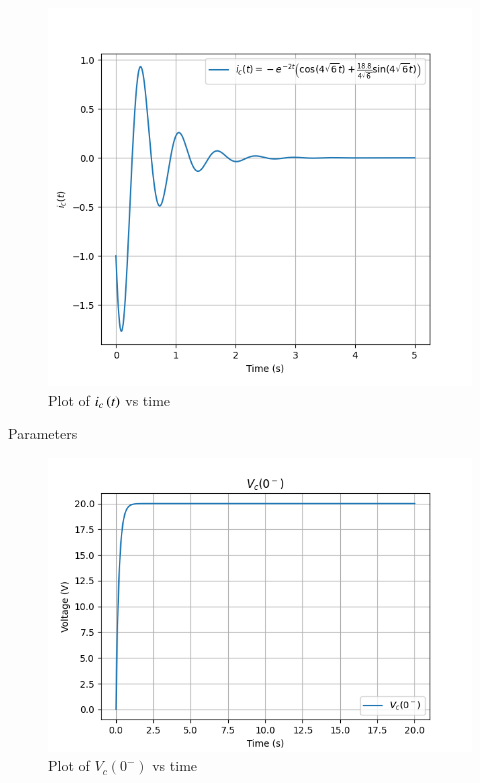 \documentclass[journal,12pt,twocolumn]{IEEEtran}
\begin{document}
\begin{figure}[ht]
   \centering
   \includegraphics[width=1.2\columnwidth]{figs/abd.png}
   \caption{Plot of $i_c \left(t\right)$ vs time}
\end{figure}


\begin{table}[ht]
    \begin{adjustbox}{width=\columnwidth}
       
    \end{adjustbox}
    \caption{Parameters}
    \label{tab:Gate.ec.44.1}

\end{table}

\begin{figure}[ht]
   \centering
   \includegraphics[width=1.2\columnwidth]{figs/ckt2.png}
   \caption{Plot of $V_c(0^-)$ vs time}
\end{figure}
\end{document}

